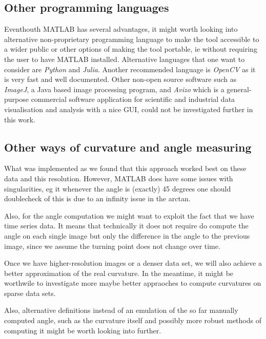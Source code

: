 \subsection{Other programming languages}

Eventhouth MATLAB has several advantages, it might worth looking into alternative non-proprietary programming language to make the tool accessible to a wider public or other options of making the tool portable, ie without requiring the user to have MATLAB installed.
Alternative languages that one want to consider are \textit{Python} and \textit{Julia}. Another recommended language is \textit{OpenCV} as it is very fast and well documented. Other non-open source software such as \textit{ImageJ}, a Java based image processing program, and \textit{Avizo} which is a general-purpose commercial software application for scientific and industrial data visualisation and analysis with a nice GUI, could not be investigated further in this work. 


\subsection{Other ways of curvature and angle measuring}

What was implemented as we found that this approach worked best on these data and this resolution. However, MATLAB does have some issues with singularities, eg it whenever the angle is (exactly) 45 degrees one should doublecheck of this is due to an infinity issue in the arctan. 

Also, for the angle computation we might want to exploit the fact that we have time series data. It means that technically it does not require do compute the angle on each single image but only the difference in the angle to the previous image, since we assume the turning point does not change over time. 

Once we have higher-resolution images or a denser data set, we will also  achieve a better approximation of the real curvature. In the meantime, it might be worthwile to investigate more maybe better appraoches to compute curvatures on sparse data sets. 

Also, alternative definitions  instead of an emulation of the so far manually computed angle, such as the curvature itself and possibly more robust methods of computing it might be worth looking into further. 
 

